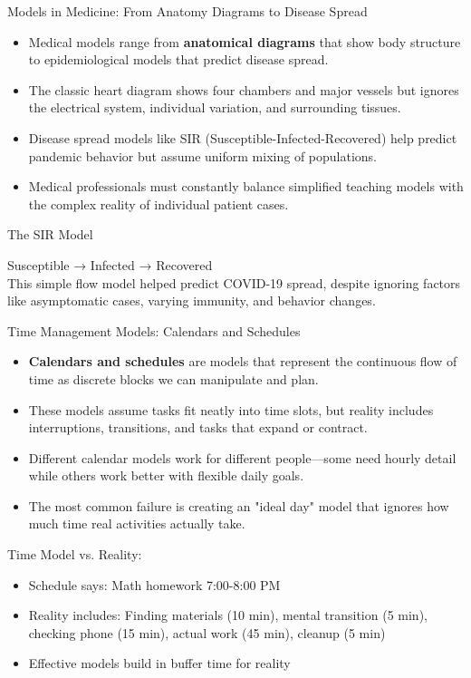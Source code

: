 \documentclass{beamer}
\begin{document}
	\begin{frame}{Models in Medicine: From Anatomy Diagrams to Disease Spread}
		\begin{itemize}
			\item Medical models range from \textbf{anatomical diagrams} that show body structure to epidemiological models that predict disease spread.
			\item The classic heart diagram shows four chambers and major vessels but ignores the electrical system, individual variation, and surrounding tissues.
			\item Disease spread models like SIR (Susceptible-Infected-Recovered) help predict pandemic behavior but assume uniform mixing of populations.
			\item Medical professionals must constantly balance simplified teaching models with the complex reality of individual patient cases.
		\end{itemize}
		
		\begin{block}{The SIR Model}
			\begin{center}
				Susceptible → Infected → Recovered \\
				\vspace{0.2cm}
				This simple flow model helped predict COVID-19 spread, despite ignoring factors like asymptomatic cases, varying immunity, and behavior changes.
			\end{center}
		\end{block}
	\end{frame}
	
	\begin{frame}{Time Management Models: Calendars and Schedules}
		\begin{itemize}
			\item \textbf{Calendars and schedules} are models that represent the continuous flow of time as discrete blocks we can manipulate and plan.
			\item These models assume tasks fit neatly into time slots, but reality includes interruptions, transitions, and tasks that expand or contract.
			\item Different calendar models work for different people—some need hourly detail while others work better with flexible daily goals.
			\item The most common failure is creating an "ideal day" model that ignores how much time real activities actually take.
		\end{itemize}
		
		\begin{example}
			Time Model vs. Reality:
			\begin{itemize}
				\item Schedule says: Math homework 7:00-8:00 PM
				\item Reality includes: Finding materials (10 min), mental transition (5 min), checking phone (15 min), actual work (45 min), cleanup (5 min)
				\item Effective models build in buffer time for reality
			\end{itemize}
		\end{example}
	\end{frame}
	
\end{document}
